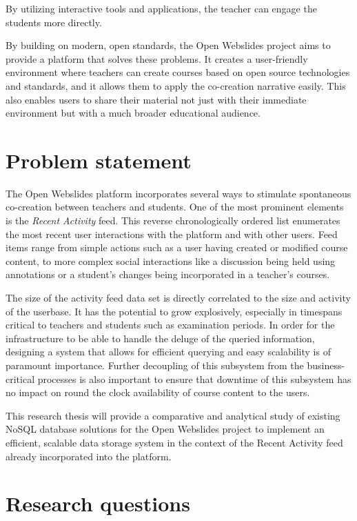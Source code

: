By utilizing interactive tools and applications, the teacher can engage the students more directly.

By building on modern, open standards, the Open Webslides project \autocite{OpenWebslides2017} aims to provide a platform that solves these problems. It creates a user-friendly environment where teachers can create courses based on open source technologies and standards, and it allows them to apply the co-creation narrative easily. This also enables users to share their material not just with their immediate environment but with a much broader educational audience.

\section{Problem statement}
\label{sec:problem-statement}

The Open Webslides platform incorporates several ways to stimulate spontaneous co-creation between teachers and students. One of the most prominent elements is the \textit{Recent Activity} feed. This reverse chronologically ordered list enumerates the most recent user interactions with the platform and with other users. Feed items range from simple actions such as a user having created or modified course content, to more complex social interactions like a discussion being held using annotations or a student's changes being incorporated in a teacher's courses.

The size of the activity feed data set is directly correlated to the size and activity of the userbase. It has the potential to grow explosively, especially in timespans critical to teachers and students such as examination periods. In order for the infrastructure to be able to handle the deluge of the queried information, designing a system that allows for efficient querying and easy scalability is of paramount importance. Further decoupling of this subsystem from the business-critical processes is also important to ensure that downtime of this subsystem has no impact on round the clock availability of course content to the users.

This research thesis will provide a comparative and analytical study of existing NoSQL database solutions for the Open Webslides project to implement an efficient, scalable data storage system in the context of the Recent Activity feed already incorporated into the platform.

\section{Research questions}
\label{sec:research-questions}

